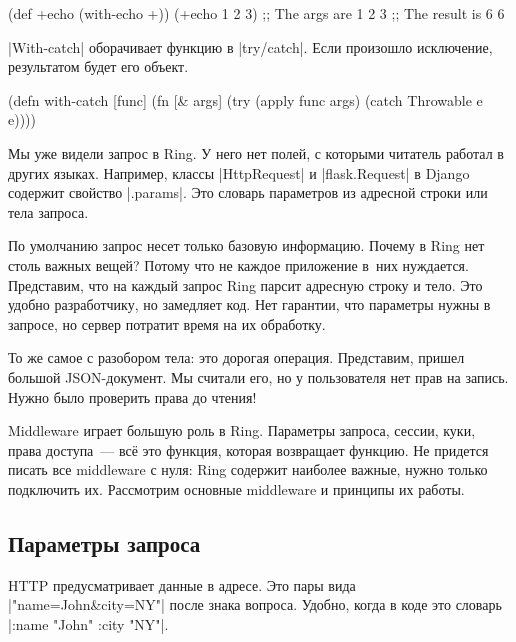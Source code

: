 \begin{english}
  \begin{clojure}
(def +echo (with-echo +))
(+echo 1 2 3)
;; The args are 1 2 3
;; The result is 6
6
  \end{clojure}
\end{english}

\spverb|With-catch| оборачивает функцию в \spverb|try/catch|. Если произошло
исключение, результатом будет его объект.

\begin{english}
  \begin{clojure}
(defn with-catch [func]
  (fn [& args]
    (try
      (apply func args)
      (catch Throwable e
        e))))
  \end{clojure}
\end{english}

Мы уже видели запрос в Ring. У него нет полей, с которыми читатель работал в
других языках. Например, классы \spverb|HttpRequest| и \spverb|flask.Request| в
Django содержит свойство \spverb|.params|. Это словарь параметров из адресной
строки или тела запроса.

По умолчанию запрос несет только базовую информацию. Почему в Ring нет столь
важных вещей? Потому что не каждое приложение в~них нуждается. Представим, что
на каждый запрос Ring парсит адресную строку и тело. Это удобно разработчику, но
замедляет код. Нет гарантии, что параметры нужны в запросе, но сервер потратит
время на их обработку.

То же самое с разобором тела: это дорогая операция. Представим, пришел большой
JSON-документ. Мы считали его, но у пользователя нет прав на запись. Нужно было
проверить права до чтения!

Middleware играет большую роль в Ring. Параметры запроса, сессии, куки, права
доступа~--- вс\"{е} это функция, которая возвращает функцию. Не придется писать
все middleware с нуля: Ring содержит наиболее важные, нужно только подключить
их. Рассмотрим основные middleware и принципы их работы.

\subsection{Параметры запроса}

\label{ring-params}

HTTP предусматривает данные в адресе. Это пары вида \spverb|"name=John&city=NY"|
после знака вопроса. Удобно, когда в коде это словарь
\spverb|{:name "John" :city "NY"}|.

